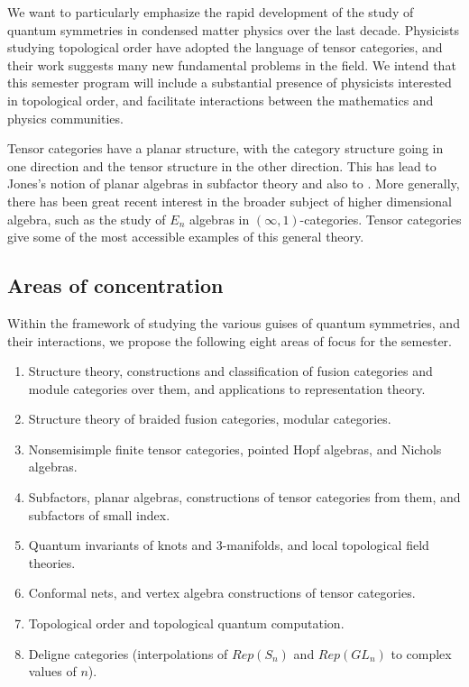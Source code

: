 \documentclass[11pt]{article}
\begin{document}
We want to particularly emphasize the rapid development of the study of quantum symmetries in condensed matter physics over the last decade. Physicists studying topological order have adopted the language of tensor categories, and their work suggests many new fundamental problems in the field. We intend that this semester program will include a substantial presence of physicists interested in topological order, and facilitate interactions between the mathematics and physics communities.

Tensor categories have a planar structure, with the category structure going in one direction and the tensor structure in the other direction. This has lead to Jones's notion of planar algebras in subfactor theory and also to . More generally, there has been great recent interest in the broader subject of higher dimensional algebra, such as the study of $E_n$ algebras in $(\infty,1)$-categories. Tensor categories give some of the most accessible examples of this general theory.

\subsection{Areas of concentration}
Within the framework of studying the various guises of quantum symmetries, and their interactions,
we propose the following eight areas of focus for the semester.

\begin{enumerate}
  \setlength{\itemsep}{1pt}
  \setlength{\parskip}{0pt}
  \setlength{\parsep}{0pt}
\item Structure theory, constructions and classification of fusion categories and module categories over them, and applications to representation theory.
\item Structure theory of braided fusion categories, modular categories.
\item Nonsemisimple finite tensor categories, pointed Hopf algebras, and Nichols algebras.
\item Subfactors, planar algebras, constructions of tensor categories from them, and subfactors of small index.
\item Quantum invariants of knots and 3-manifolds, and local topological field theories.
\item Conformal nets, and vertex algebra constructions of tensor categories.
\item Topological order and topological quantum computation.
\item Deligne categories (interpolations of $Rep(S_n)$ and $Rep(GL_n)$ to complex values of $n$).
\end{enumerate}
\end{document}
